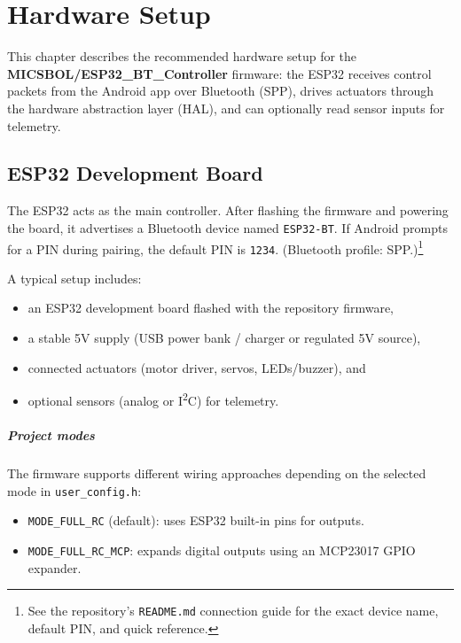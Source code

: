 \chapter{Hardware Setup}
\label{ch:hardware-setup}

This chapter describes the recommended hardware setup for the
\textbf{MICSBOL/ESP32\_BT\_Controller} firmware: the ESP32 receives control packets from the Android app over
Bluetooth (SPP), drives actuators through the hardware abstraction layer (HAL), and can optionally read
sensor inputs for telemetry.

\section{ESP32 Development Board}
\label{sec:hw-esp32-board}

The ESP32 acts as the main controller. After flashing the firmware and powering the board, it advertises a
Bluetooth device named \texttt{ESP32-BT}. If Android prompts for a PIN during pairing, the default PIN is
\texttt{1234}. (Bluetooth profile: SPP.)\footnote{See the repository's \texttt{README.md} connection guide for the
    exact device name, default PIN, and quick reference.}

A typical setup includes:
\begin{itemize}
    \item an ESP32 development board flashed with the repository firmware,
    \item a stable 5V supply (USB power bank / charger or regulated 5V source),
    \item connected actuators (motor driver, servos, LEDs/buzzer), and
    \item optional sensors (analog or I\textsuperscript{2}C) for telemetry.
\end{itemize}

\paragraph{Project modes}
The firmware supports different wiring approaches depending on the selected mode in \texttt{user\_config.h}:
\begin{itemize}
    \item \texttt{MODE\_FULL\_RC} (default): uses ESP32 built-in pins for outputs.
    \item \texttt{MODE\_FULL\_RC\_MCP}: expands digital outputs using an MCP23017 GPIO expander.
\end{itemize}

